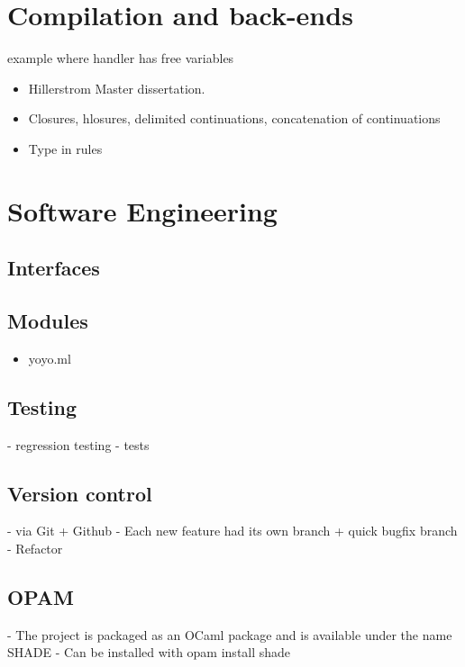 \documentclass[class=article, crop=false]{standalone}
\begin{document}
\section{Compilation and back-ends}

example where handler has free variables

\begin{itemize}
    \item Hillerstrom Master dissertation.
    \item Closures, hlosures, delimited continuations, concatenation of continuations
\end{itemize}

\begin{itemize}
    \item Type in rules
\end{itemize}





\section{Software Engineering}

\subsection{Interfaces}
\subsection{Modules}
\begin{itemize}
    \item yoyo.ml
\end{itemize}

\subsection{Testing}
- regression testing
- tests

\subsection{Version control}
- via Git + Github
- Each new feature had its own branch + quick bugfix branch
- Refactor

\subsection{OPAM}
- The project is packaged as an OCaml package and is available under the name SHADE
- Can be installed with opam install shade
\end{document}

